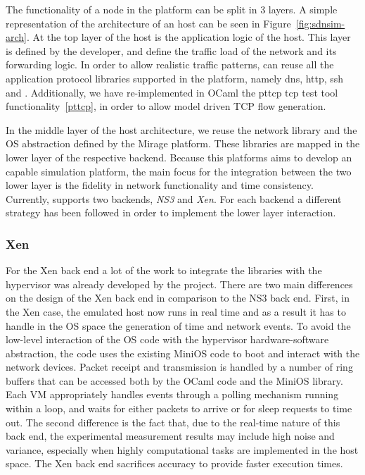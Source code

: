 The functionality of a node in the \sdnsim platform can be split in 3 layers.  A
simple representation of the architecture of an \sdnsim host can be seen in
Figure~\ref{fig:sdnsim-arch}.  At the top layer of the host is the application
logic of the host. This layer is defined by the developer, and define the
traffic load of the network and its forwarding logic. In order to allow
realistic traffic patterns, \sdnsim can reuse all the application protocol libraries
supported in the \mirage platform, namely dns, http, ssh and \of. Additionally,
we have re-implemented in OCaml the pttcp tcp test tool functionality~\ref{pttcp},
in order to allow model driven TCP flow generation. 

In the middle layer of the host architecture, we reuse the network library and
the OS abstraction defined by the Mirage platform. These libraries are mapped in
the lower layer of the respective backend. Because this platforms aims to
develop an \of capable simulation platform, the main focus for the integration
between the two lower layer is the fidelity in network functionality and time
consistency. Currently, \sdnsim supports two
backends, {\it NS3} and {\it Xen}. For each backend a different strategy has been 
followed in order to implement the lower layer interaction. 

\subsubsection{Xen}

For the Xen back end a lot of the work to integrate the \mirage{}
libraries with the hypervisor was already developed by the \mirage{}
project. There are two main differences on the design of the Xen back
end in comparison to the NS3 back end.  First, in the Xen case, the
emulated host now runs in real time and as a result it has to handle
in the OS space the generation of time and network events. To avoid
the low-level interaction of the OS code with the hypervisor
hardware-software abstraction, the code uses the existing MiniOS code
to boot and interact with the network devices. Packet receipt and
transmission is handled by a number of ring buffers that can be
accessed both by the OCaml code and the MiniOS library. Each VM
appropriately handles events through a polling mechanism running
within a loop, and waits for either packets to arrive or for sleep
requests to time out. The second difference is the fact that, due to
the real-time nature of this back end, the experimental measurement
results may include high noise and variance, especially when highly
computational tasks are implemented in the host space. The Xen back end
sacrifices accuracy to provide faster execution times.


